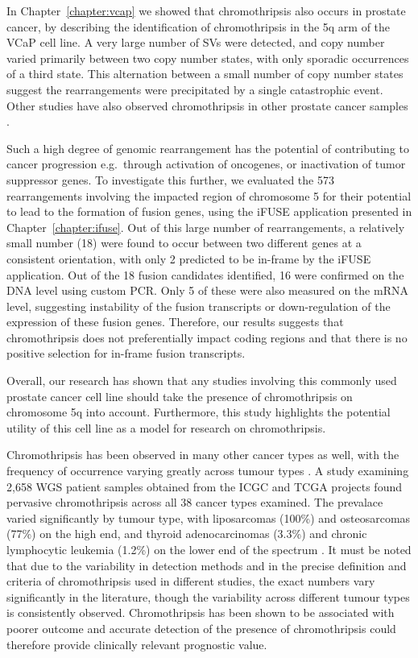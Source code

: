 In Chapter~\ref{chapter:vcap} we showed that chromothripsis also occurs in prostate cancer, by describing the identification of chromothripsis in the 5q arm of the VCaP cell line. A very large number of SVs were detected, and copy number varied primarily between two copy number states, with only sporadic occurrences of a third state. This alternation between a small number of copy number states suggest the rearrangements were precipitated by a single catastrophic event.
Other studies have also observed chromothripsis in other prostate cancer samples \cite{wu2012poly,Baca2013}.

Such a high degree of genomic rearrangement has the potential of contributing to cancer progression e.g.\ through activation of oncogenes, or inactivation of tumor suppressor genes.
To investigate this further, we evaluated the 573 rearrangements involving the impacted region of chromosome 5 for their potential to lead to the formation of fusion genes, using the iFUSE application presented in Chapter~\ref{chapter:ifuse}.
Out of this large number of rearrangements, a relatively small number (18) were found to occur between two different genes at a consistent orientation, with only 2 predicted to be in-frame by the iFUSE application.
Out of the 18 fusion candidates identified, 16 were confirmed on the DNA level using custom PCR\@.
Only 5 of these were also measured on the mRNA level, suggesting instability of the fusion transcripts or down-regulation of the expression of these fusion genes.
Therefore, our results suggests that chromothripsis does not preferentially impact coding regions and that there is no positive selection for in-frame fusion transcripts.

Overall, our research has shown that any studies involving this commonly used prostate cancer cell line should take the presence of chromothripsis on chromosome 5q into account.
Furthermore, this study highlights the potential utility of this cell line as a model for research on chromothripsis.

Chromothripsis has been observed in many other cancer types as well, with the frequency of occurrence varying greatly across tumour types \cite{cortes2020comprehensive,voronina2020landscape,Koltsova2019,kloosterman2014prevalence}.
A study examining 2,658 WGS patient samples obtained from the ICGC and TCGA projects found pervasive chromothripsis across all 38 cancer types examined. The prevalace varied significantly by tumour type, with liposarcomas (100\%) and osteosarcomas (77\%) on the high end, and thyroid adenocarcinomas (3.3\%) and chronic lymphocytic leukemia (1.2\%) on the lower end of the spectrum \cite{cortes2020comprehensive}.
It must be noted that due to the variability in detection methods and in the precise definition and criteria of chromothripsis used in different studies, the exact numbers vary significantly in the literature, though the variability across different tumour types is consistently observed.
Chromothripsis has been shown to be associated with poorer outcome \cite{fontana2018chromothripsis,Hirsch2012,magrangeas2011chromothripsis,molenaar} and accurate detection of the presence of chromothripsis could therefore provide clinically relevant prognostic value.

